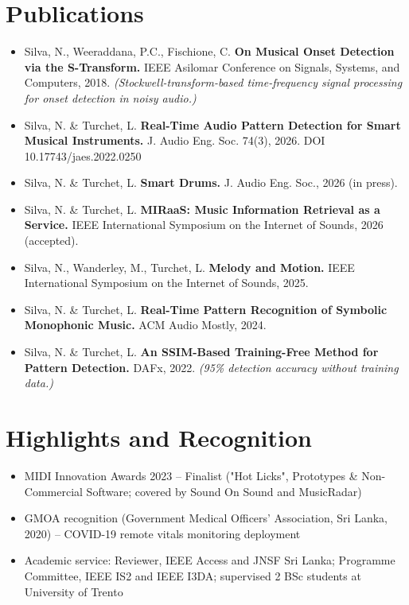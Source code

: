 \documentclass[11pt]{article}
\begin{document}
\section*{Publications}
\begin{itemize}[leftmargin=1.4em, itemsep=-0.2em, topsep=0.1em]
  \item Silva, N., Weeraddana, P.C., Fischione, C. \textbf{On Musical Onset Detection via the S-Transform.} IEEE Asilomar Conference on Signals, Systems, and Computers, 2018. \textit{(Stockwell-transform-based time-frequency signal processing for onset detection in noisy audio.)}
  \item Silva, N. \& Turchet, L. \textbf{Real-Time Audio Pattern Detection for Smart Musical Instruments.} J. Audio Eng. Soc. 74(3), 2026. DOI 10.17743/jaes.2022.0250
  \item Silva, N. \& Turchet, L. \textbf{Smart Drums.} J. Audio Eng. Soc., 2026 (in press).
  \item Silva, N. \& Turchet, L. \textbf{MIRaaS: Music Information Retrieval as a Service.} IEEE International Symposium on the Internet of Sounds, 2026 (accepted).
  \item Silva, N., Wanderley, M., Turchet, L. \textbf{Melody and Motion.} IEEE International Symposium on the Internet of Sounds, 2025.
  \item Silva, N. \& Turchet, L. \textbf{Real-Time Pattern Recognition of Symbolic Monophonic Music.} ACM Audio Mostly, 2024.
  \item Silva, N. \& Turchet, L. \textbf{An SSIM-Based Training-Free Method for Pattern Detection.} DAFx, 2022. \textit{(95\% detection accuracy without training data.)}
\end{itemize}

\section*{Highlights and Recognition}
\begin{itemize}[leftmargin=1.4em, itemsep=-0.2em, topsep=0.1em]
  \item MIDI Innovation Awards 2023 -- Finalist ("Hot Licks", Prototypes \& Non-Commercial Software; covered by Sound On Sound and MusicRadar)
  \item GMOA recognition (Government Medical Officers' Association, Sri Lanka, 2020) -- COVID-19 remote vitals monitoring deployment
  \item Academic service: Reviewer, IEEE Access and JNSF Sri Lanka; Programme Committee, IEEE IS2 and IEEE I3DA; supervised 2 BSc students at University of Trento
\end{itemize}
\end{document}
